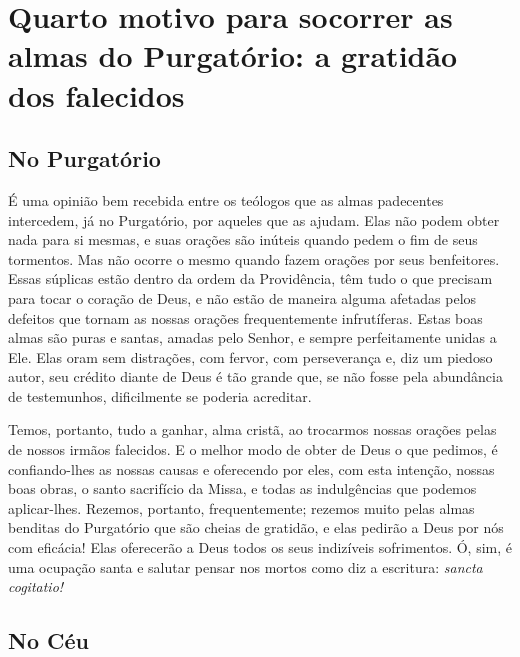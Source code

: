 \renewcommand{\thechapterdisplay}{Décimo nono dia}
\renewcommand{\thechapterrunner}{Quarto motivo: a gratidão dos falecidos}
\chapter[Décimo nono dia --- Quarto motivo para socorrer as almas do Purgatório: a gratidão dos falecidos]{Quarto motivo para socorrer as almas do Purgatório: a gratidão dos falecidos}
\section*{No Purgatório}

É uma opinião bem recebida entre os teólogos que as almas padecentes intercedem, já no Purgatório, por aqueles que as ajudam. Elas não podem obter nada para si mesmas, e suas orações são inúteis quando pedem o fim de seus tormentos. Mas não ocorre o mesmo quando fazem orações por seus benfeitores. Essas súplicas estão dentro da ordem da Providência, têm tudo o que precisam para tocar o coração de Deus, e não estão de maneira alguma afetadas pelos defeitos que tornam as nossas orações frequentemente infrutíferas. Estas boas almas são puras e santas, amadas pelo Senhor, e sempre perfeitamente unidas a Ele. Elas oram sem distrações, com fervor, com perseverança e, diz um piedoso autor, seu crédito diante de Deus é tão grande que, se não fosse pela abundância de testemunhos, dificilmente se poderia acreditar. 

Temos, portanto, tudo a ganhar, alma cristã, ao trocarmos nossas orações pelas de nossos irmãos falecidos. E o melhor modo de obter de Deus o que pedimos, é confiando-lhes as nossas causas e oferecendo por eles, com esta intenção, nossas boas obras, o santo sacrifício da Missa, e todas as indulgências que podemos aplicar-lhes. Rezemos, portanto, frequentemente; rezemos muito pelas almas benditas do Purgatório que são cheias de gratidão, e elas pedirão a Deus por nós com eficácia! Elas oferecerão a Deus todos os seus indizíveis sofrimentos. Ó, sim, é uma ocupação santa e salutar pensar nos mortos como diz a escritura: \textit{sancta cogitatio!}


\section*{No Céu}

